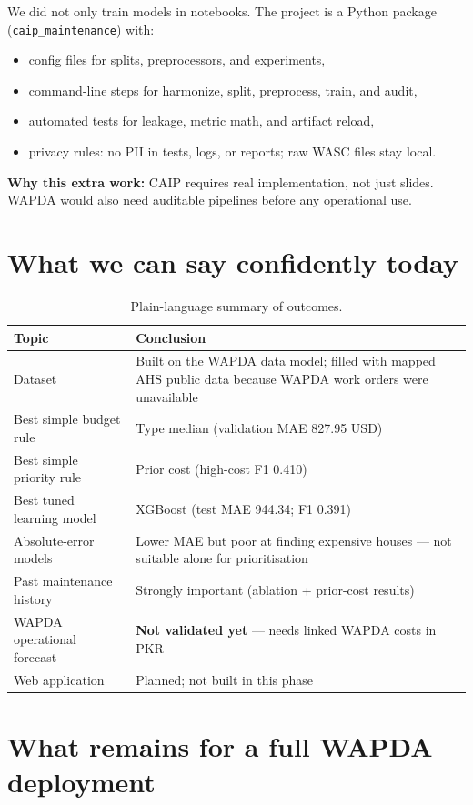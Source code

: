 \documentclass[11pt,a4paper]{article}
\begin{document}
We did not only train models in notebooks. The project is a Python package (\texttt{caip\_maintenance}) with:
\begin{itemize}
  \item config files for splits, preprocessors, and experiments,
  \item command-line steps for harmonize, split, preprocess, train, and audit,
  \item automated tests for leakage, metric math, and artifact reload,
  \item privacy rules: no PII in tests, logs, or reports; raw WASC files stay local.
\end{itemize}

\textbf{Why this extra work:} CAIP requires real implementation, not just slides. WAPDA would also need auditable pipelines before any operational use.

\section{What we can say confidently today}

\begin{table}[ht]
\centering
\caption{Plain-language summary of outcomes.}
\begin{tabular}{@{}p{4.2cm}p{9.8cm}@{}}
\toprule
Topic & Conclusion \\
\midrule
Dataset & Built on the WAPDA data model; filled with mapped AHS public data because WAPDA work orders were unavailable \\
Best simple budget rule & Type median (validation MAE 827.95 USD) \\
Best simple priority rule & Prior cost (high-cost F1 0.410) \\
Best tuned learning model & XGBoost (test MAE 944.34; F1 0.391) \\
Absolute-error models & Lower MAE but poor at finding expensive houses --- not suitable alone for prioritisation \\
Past maintenance history & Strongly important (ablation + prior-cost results) \\
WAPDA operational forecast & \textbf{Not validated yet} --- needs linked WAPDA costs in PKR \\
Web application & Planned; not built in this phase \\
\bottomrule
\end{tabular}
\end{table}

\section{What remains for a full WAPDA deployment}
\end{document}
